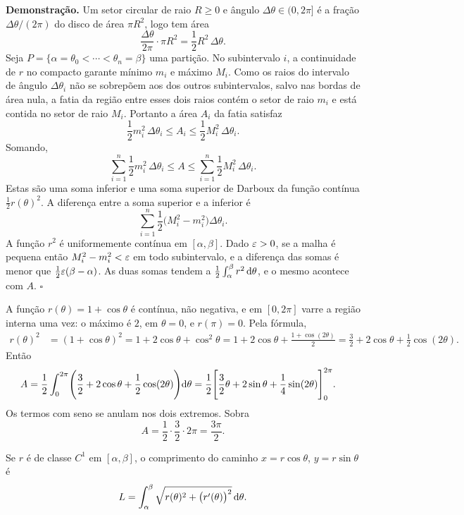 \documentclass[11pt,a4paper]{article}
\begin{document}
\noindent\textbf{Demonstração.}
Um setor circular de raio \(R\ge 0\) e ângulo \(\Delta\theta\in(0,2\pi]\) é a fração \(\Delta\theta/(2\pi)\) do disco de área \(\pi R^{2}\), logo tem área
\[
\frac{\Delta\theta}{2\pi}\cdot\pi R^{2}=\frac12 R^{2}\,\Delta\theta.
\]
Seja \(P=\{\alpha=\theta_{0}<\cdots<\theta_{n}=\beta\}\) uma partição. No subintervalo \(i\), a continuidade de \(r\) no compacto garante mínimo \(m_{i}\) e máximo \(M_{i}\). Como os raios do intervalo de ângulo \(\Delta\theta_{i}\) não se sobrepõem aos dos outros subintervalos, salvo nas bordas de área nula, a fatia da região entre esses dois raios contém o setor de raio \(m_{i}\) e está contida no setor de raio \(M_{i}\). Portanto a área \(A_{i}\) da fatia satisfaz
\[
\frac12 m_{i}^{2}\,\Delta\theta_{i}
\le A_{i}
\le\frac12 M_{i}^{2}\,\Delta\theta_{i}.
\]
Somando,
\[
\sum_{i=1}^{n}\frac12 m_{i}^{2}\,\Delta\theta_{i}
\le A
\le\sum_{i=1}^{n}\frac12 M_{i}^{2}\,\Delta\theta_{i}.
\]
Estas são uma soma inferior e uma soma superior de Darboux da função contínua \(\frac12 r(\theta)^{2}\). A diferença entre a soma superior e a inferior é
\[
\sum_{i=1}^{n}\frac12\bigl(M_{i}^{2}-m_{i}^{2}\bigr)\Delta\theta_{i}.
\]
A função \(r^{2}\) é uniformemente contínua em \([\alpha,\beta]\). Dado \(\varepsilon>0\), se a malha é pequena então \(M_{i}^{2}-m_{i}^{2}<\varepsilon\) em todo subintervalo, e a diferença das somas é menor que \(\frac12\varepsilon(\beta-\alpha)\). As duas somas tendem a \(\frac12\int_{\alpha}^{\beta} r^{2}\,\mathrm{d}\theta\), e o mesmo acontece com \(A\).
\hfill\(\square\)

\begin{exemplo}[Área da cardióide \(r=1+\cos\theta\)]
A função \(r(\theta)=1+\cos\theta\) é contínua, não negativa, e em \([0,2\pi]\) varre a região interna uma vez: o máximo é \(2\), em \(\theta=0\), e \(r(\pi)=0\). Pela fórmula,
\begin{align*}
r(\theta)^{2}
&=(1+\cos\theta)^{2}
=1+2\cos\theta+\cos^{2}\theta
=1+2\cos\theta+\frac{1+\cos(2\theta)}{2}
=\frac{3}{2}+2\cos\theta+\frac12\cos(2\theta).
\end{align*}
Então
\begin{align*}
A
&=\frac12\int_{0}^{2\pi}\Biggl(\frac32+2\cos\theta+\frac12\cos(2\theta)\Biggr)\mathrm{d}\theta
=\frac12\Biggl[\frac32\theta+2\sin\theta+\frac14\sin(2\theta)\Biggr]_{0}^{2\pi}.
\end{align*}
Os termos com seno se anulam nos dois extremos. Sobra
\[
A=\frac12\cdot\frac32\cdot 2\pi=\frac{3\pi}{2}.
\]
\end{exemplo}

\begin{teorema}
Se \(r\) é de classe \(C^1\) em \([\alpha,\beta]\), o comprimento do caminho \(x=r\cos\theta\), \(y=r\sin\theta\) é
\begin{equation}
L=\int_{\alpha}^{\beta}\sqrt{r(\theta)^{2}+\bigl(r'(\theta)\bigr)^{2}}\,\mathrm{d}\theta.
\label{eq:comp-polar}
\end{equation}
\end{teorema}
\end{document}
